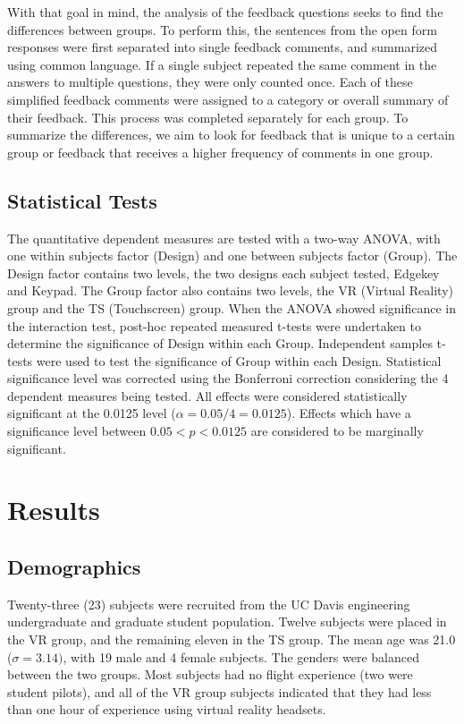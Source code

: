 With that goal in mind, the analysis of the feedback questions seeks to find the differences between groups.
To perform this, the sentences from the open form responses were first separated into single feedback comments, and summarized using common language.
If a single subject repeated the same comment in the answers to multiple questions, they were only counted once.
Each of these simplified feedback comments were assigned to a category or overall summary of their feedback.
This process was completed separately for each group.
To summarize the differences, we aim to look for feedback that is unique to a certain group or feedback that receives a higher frequency of comments in one group.

\subsection{Statistical Tests}

The quantitative dependent measures are tested with a two-way ANOVA, with one within subjects factor (Design) and one between subjects factor (Group).
The Design factor contains two levels, the two designs each subject tested, Edgekey and Keypad.
The Group factor also contains two levels, the VR (Virtual Reality) group and the TS (Touchscreen) group.
When the ANOVA showed significance in the interaction test, post-hoc repeated measured t-tests were undertaken to determine the significance of Design within each Group.
Independent samples t-tests were used to test the significance of Group within each Design.
Statistical significance level was corrected using the Bonferroni correction considering the 4 dependent measures being tested.
All effects were considered statistically significant at the 0.0125 level ($\alpha = 0.05/4 = 0.0125$).
Effects which have a significance level between $0.05<p<0.0125$ are considered to be marginally significant.

\section{Results}

\subsection{Demographics}

Twenty-three (23) subjects were recruited from the UC Davis engineering undergraduate and graduate student population.
Twelve subjects were placed in the VR group, and the remaining eleven in the TS group.
The mean age was 21.0 ($\sigma = 3.14)$, with 19 male and 4 female subjects.
The genders were balanced between the two groups.
Most subjects had no flight experience (two were student pilots), and all of the VR group subjects indicated that they had less than one hour of experience using virtual reality headsets.

